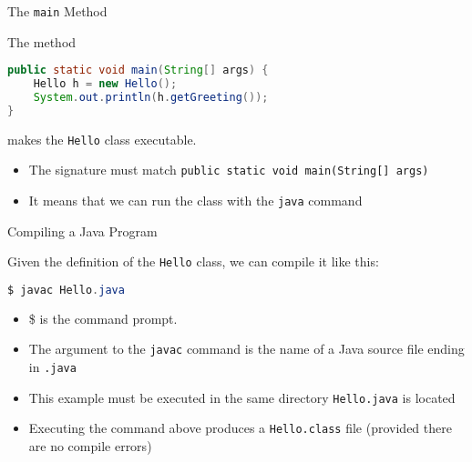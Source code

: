 \documentclass{beamer}
\begin{document}
\begin{frame}[fragile]{The {\tt main} Method}


The method
\begin{lstlisting}[language=Java]
public static void main(String[] args) {
    Hello h = new Hello();
    System.out.println(h.getGreeting());
}
\end{lstlisting}
makes the {\tt Hello} class executable.
\begin{itemize}
\item The signature must match {\tt public static void main(String[] args)}
\item It means that we can run the class with the {\tt java} command
\end{itemize}


\end{frame}

\begin{frame}[fragile]{Compiling a Java Program}


Given the definition of the {\tt Hello} class, we can compile it like this:
\begin{lstlisting}[language=Java]
$ javac Hello.java
\end{lstlisting}

\begin{itemize}
\item \$ is the command prompt.
\item The argument to the {\tt javac} command is the name of a Java source file ending in {\tt .java}
\item This example must be executed in the same directory {\tt Hello.java} is located
\item Executing the command above produces a {\tt Hello.class} file (provided there are no compile errors)
\end{itemize}

\end{frame}
\end{document}
